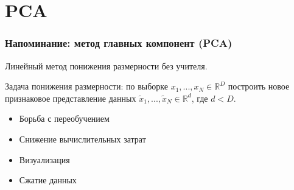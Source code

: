 \documentclass[10pt]{beamer}
\newcommand{\real}{\mathbb{R}}
\begin{document}
\section{PCA}



\begin{frame}
\frametitle{Напоминание: метод главных компонент (PCA)}

Линейный метод понижения размерности без учителя.

\vspace{\baselineskip}
Задача понижения размерности: по выборке $x_{1}, ..., x_{N} \in \real^{D}$  построить новое признаковое представление данных $\widetilde{x}_{1}, ..., \widetilde{x}_{N} \in \real^{d}$, где $d < D$.

\vspace{\baselineskip}

\begin{itemize}
	\item Борьба с переобучением
	\item Снижение вычислительных затрат
	\item Визуализация
	\item Сжатие данных
\end{itemize}


\end{frame}
\end{document}
